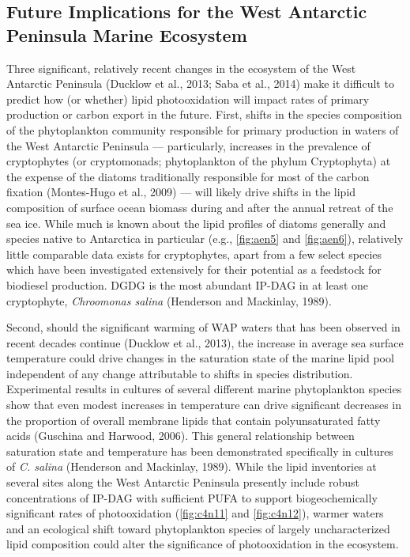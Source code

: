 \subsection{Future Implications for the West Antarctic Peninsula Marine Ecosystem}

Three significant, relatively recent changes in the ecosystem of the West Antarctic Peninsula (Ducklow et al., 2013; Saba et al., 2014) make it difficult to predict how (or whether) lipid photooxidation will impact rates of primary production or carbon export in the future. First, shifts in the species composition of the phytoplankton community responsible for primary production in waters of the West Antarctic Peninsula --- particularly, increases in the prevalence of cryptophytes (or cryptomonads; phytoplankton of the phylum Cryptophyta) at the expense of the diatoms traditionally responsible for most of the carbon fixation (Montes-Hugo et al., 2009) --- will likely drive shifts in the lipid composition of surface ocean biomass during and after the annual retreat of the sea ice. While much is known about the lipid profiles of diatoms generally and species native to Antarctica in particular (e.g., \autoref{fig:aen5} and \autoref{fig:aen6}), relatively little comparable data exists for cryptophytes, apart from a few select species which have been investigated extensively for their potential as a feedstock for biodiesel production. DGDG is the most abundant IP-DAG in at least one cryptophyte, \emph{Chroomonas salina} (Henderson and Mackinlay, 1989).

Second, should the significant warming of WAP waters that has been observed in recent decades continue (Ducklow et al., 2013), the increase in average sea surface temperature could drive changes in the saturation state of the marine lipid pool independent of any change attributable to shifts in species distribution. Experimental results in cultures of several different marine phytoplankton species show that even modest increases in temperature can drive significant decreases in the proportion of overall membrane lipids that contain polyunsaturated fatty acids (Guschina and Harwood, 2006). This general relationship between saturation state and temperature has been demonstrated specifically in cultures of \emph{C. salina} (Henderson and Mackinlay, 1989). While the lipid inventories at several sites along the West Antarctic Peninsula presently include robust concentrations of IP-DAG with sufficient PUFA to support biogeochemically significant rates of photooxidation (\autoref{fig:c4n11} and \autoref{fig:c4n12}), warmer waters and an ecological shift toward phytoplankton species of largely uncharacterized lipid composition could alter the significance of photooxidation in the ecosystem.

